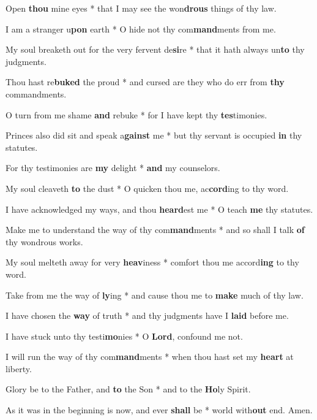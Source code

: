 \begin{multicols}{2}
	Open \textbf{thou} mine eyes * that I may see the won\textbf{drous} things of thy law.
	
	I am a stranger u\textbf{pon} earth * O hide not thy com\textbf{mand}ments from me.
	
	My soul breaketh out for the very fervent de\textbf{si}re * that it hath always un\textbf{to} thy judgments.
	
	Thou hast re\textbf{buked} the proud * and cursed are they who do err from \textbf{thy} commandments.
	
	O turn from me shame \textbf{and} rebuke * for I have kept thy \textbf{tes}timonies.
	
	Princes also did sit and speak a\textbf{gainst} me * but thy servant is occupied \textbf{in} thy statutes.
	
	For thy testimonies are \textbf{my} delight * \textbf{and} my counselors.
	
	My soul cleaveth \textbf{to} the dust * O quicken thou me, ac\textbf{cord}ing to thy word.
	
	I have acknowledged my ways, and thou \textbf{heard}est me * O teach \textbf{me} thy statutes.
	
	Make me to understand the way of thy com\textbf{mand}ments * and so shall I talk \textbf{of} thy wondrous works.
	
	My soul melteth away for very \textbf{heav}iness * comfort thou me accord\textbf{ing} to thy word.
	
	Take from me the way of \textbf{ly}ing * and cause thou me to \textbf{make} much of thy law.
	
	I have chosen the \textbf{way} of truth * and thy judgments have I \textbf{laid} before me.
	
	I have stuck unto thy testi\textbf{mo}nies * O \textbf{Lord}, confound me not.
	
	I will run the way of thy com\textbf{mand}ments * when thou hast set my \textbf{heart} at liberty.
	
	Glory be to the Father, and \textbf{to} the Son * and to the \textbf{Ho}ly Spirit.
	
	As it was in the beginning is now, and ever \textbf{shall} be * world with\textbf{out} end. Amen.
\end{multicols}